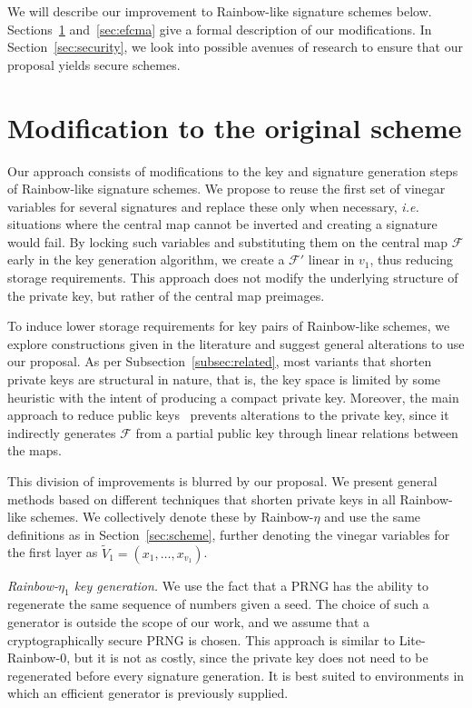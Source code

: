 \documentclass[openright]{report}
\begin{document}
We will describe our improvement to Rainbow-like signature schemes below.
Sections~\ref{sec:mod} and~\ref{sec:efcma} give a formal description
of our modifications. In Section~\ref{sec:security}, we look into 
possible avenues of research to ensure that our proposal yields secure
schemes.

\section{Modification to the original scheme}\label{sec:mod}

Our approach consists of modifications to the key and signature generation
steps of Rainbow-like signature schemes. We propose to reuse the first set of
vinegar variables for several signatures and replace these only when necessary,
\emph{i.e.} situations where the central map cannot be inverted and creating a
signature would fail. By locking such variables and substituting them on the
central map $\mathcal{F}$ early in the key generation algorithm, we create a
$\mathcal{F}'$ linear in $v_{1}$, thus reducing storage requirements. This
approach does not modify the underlying structure of the private key, but
rather of the central map preimages.

To induce lower storage requirements for key pairs of Rainbow-like schemes, we
explore constructions given in the literature and suggest general alterations
to use our proposal. As per Subsection~\ref{subsec:related}, most variants that
shorten private keys are structural in nature, that is, the key space is
limited by some heuristic with the intent of producing a compact private key.
Moreover, the main approach to reduce public keys~\cite{Petzoldt:201307:phd}
prevents alterations to the private key,
since it indirectly generates $\mathcal{F}$ from a partial public key through
linear relations between the maps.

This division of improvements is blurred by our proposal. We present general
methods based on different techniques that shorten private keys in all
Rainbow-like schemes. We collectively denote these by Rainbow-$\eta$ and use
the same definitions as in Section~\ref{sec:scheme}, further denoting
the vinegar variables for the first layer as
$\widetilde{V}_{1} = (x_{1}, \dots, x_{v_{1}})$.

\emph{Rainbow-$\eta_{1}$ key generation.}
We use the fact that a PRNG has the ability to regenerate the same sequence of
numbers given a seed. The choice of such a generator is outside the scope of
our work, and we assume that a cryptographically secure PRNG is chosen. This
approach is similar to Lite-Rainbow-0, but it is not as costly, since the
private key does not need to be regenerated before every signature generation.
It is best suited to environments in which an efficient generator is previously
supplied.
\end{document}
